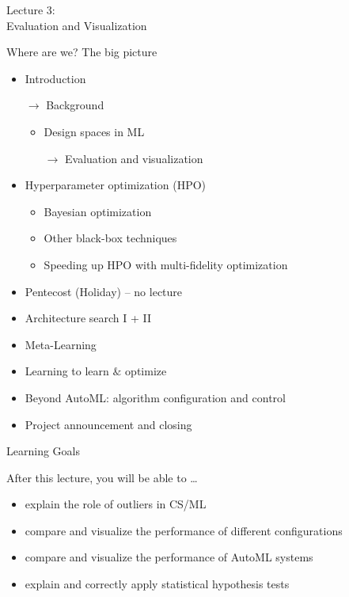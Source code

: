 \begin{frame}[c]{}

\centering
\huge
Lecture 3:\\
Evaluation and Visualization
\end{frame}
\begin{frame}[c]{Where are we? The big picture}

\begin{itemize}
	\item Introduction
	\item[$\to$] Background
	\begin{itemize}
		\item Design spaces in ML
		\item[$\to$] Evaluation and visualization
	\end{itemize}
	\item Hyperparameter optimization (HPO)
	\begin{itemize}
	  \item Bayesian optimization
	  \item Other black-box techniques
	  \item Speeding up HPO with multi-fidelity optimization
	\end{itemize}
	\item Pentecost (Holiday) -- no lecture
	\item Architecture search I + II
	\item Meta-Learning
	\item Learning to learn $\&$ optimize
	\item Beyond AutoML: algorithm configuration and control
	\item Project announcement and closing
\end{itemize}


\end{frame}
\begin{frame}[c]{Learning Goals}

After this lecture, you will be able to \ldots

\begin{itemize}
	\item explain the role of outliers in CS/ML
	\item compare and visualize the performance of different configurations
	\item compare and visualize the performance of AutoML systems
	\item explain and correctly apply statistical hypothesis tests
\end{itemize}

\end{frame}

